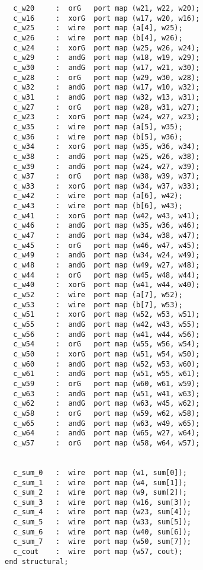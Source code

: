 \begin{lstlisting}
  c_w20     :  orG   port map (w21, w22, w20);
  c_w16     :  xorG  port map (w17, w20, w16);
  c_w25     :  wire  port map (a[4], w25);
  c_w26     :  wire  port map (b[4], w26);
  c_w24     :  xorG  port map (w25, w26, w24);
  c_w29     :  andG  port map (w18, w19, w29);
  c_w30     :  andG  port map (w17, w21, w30);
  c_w28     :  orG   port map (w29, w30, w28);
  c_w32     :  andG  port map (w17, w10, w32);
  c_w31     :  andG  port map (w32, w13, w31);
  c_w27     :  orG   port map (w28, w31, w27);
  c_w23     :  xorG  port map (w24, w27, w23);
  c_w35     :  wire  port map (a[5], w35);
  c_w36     :  wire  port map (b[5], w36);
  c_w34     :  xorG  port map (w35, w36, w34);
  c_w38     :  andG  port map (w25, w26, w38);
  c_w39     :  andG  port map (w24, w27, w39);
  c_w37     :  orG   port map (w38, w39, w37);
  c_w33     :  xorG  port map (w34, w37, w33);
  c_w42     :  wire  port map (a[6], w42);
  c_w43     :  wire  port map (b[6], w43);
  c_w41     :  xorG  port map (w42, w43, w41);
  c_w46     :  andG  port map (w35, w36, w46);
  c_w47     :  andG  port map (w34, w38, w47);
  c_w45     :  orG   port map (w46, w47, w45);
  c_w49     :  andG  port map (w34, w24, w49);
  c_w48     :  andG  port map (w49, w27, w48);
  c_w44     :  orG   port map (w45, w48, w44);
  c_w40     :  xorG  port map (w41, w44, w40);
  c_w52     :  wire  port map (a[7], w52);
  c_w53     :  wire  port map (b[7], w53);
  c_w51     :  xorG  port map (w52, w53, w51);
  c_w55     :  andG  port map (w42, w43, w55);
  c_w56     :  andG  port map (w41, w44, w56);
  c_w54     :  orG   port map (w55, w56, w54);
  c_w50     :  xorG  port map (w51, w54, w50);
  c_w60     :  andG  port map (w52, w53, w60);
  c_w61     :  andG  port map (w51, w55, w61);
  c_w59     :  orG   port map (w60, w61, w59);
  c_w63     :  andG  port map (w51, w41, w63);
  c_w62     :  andG  port map (w63, w45, w62);
  c_w58     :  orG   port map (w59, w62, w58);
  c_w65     :  andG  port map (w63, w49, w65);
  c_w64     :  andG  port map (w65, w27, w64);
  c_w57     :  orG   port map (w58, w64, w57);

  
  c_sum_0   :  wire  port map (w1, sum[0]);
  c_sum_1   :  wire  port map (w4, sum[1]);
  c_sum_2   :  wire  port map (w9, sum[2]);
  c_sum_3   :  wire  port map (w16, sum[3]);
  c_sum_4   :  wire  port map (w23, sum[4]);
  c_sum_5   :  wire  port map (w33, sum[5]);
  c_sum_6   :  wire  port map (w40, sum[6]);
  c_sum_7   :  wire  port map (w50, sum[7]);
  c_cout    :  wire  port map (w57, cout);
end structural;
\end{lstlisting}
